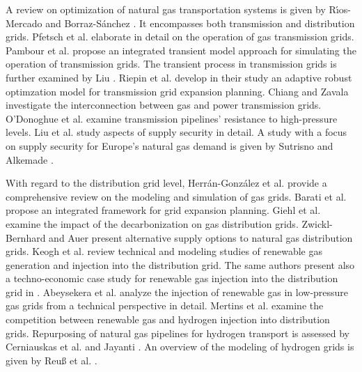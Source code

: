 A review on optimization of natural gas transportation systems is given by R{\'\i}os-Mercado and Borraz-S{\'a}nchez \cite{rios2015optimization}. It encompasses both transmission and distribution grids. Pfetsch et al. \cite{pfetsch2015validation} elaborate in detail on the operation of gas transmission grids. Pambour et al. \cite{pambour2016integrated} propose an integrated transient model approach for simulating the operation of transmission grids. The transient process in transmission grids is further examined by Liu \cite{liu2011coordinated}. Riepin et al. \cite{riepin2022adaptive} develop in their study an adaptive robust optimzation model for transmission grid expansion planning. Chiang and Zavala \cite{chiang2016large} investigate the interconnection between gas and power transmission grids. O'Donoghue et al. \cite{o1997development} examine transmission pipelines' resistance to high-pressure levels. Liu et al. \cite{liu2009security} study aspects of supply security in detail. A study with a focus on supply security for Europe's natural gas demand is given by Sutrisno and Alkemade \cite{sutrisno2020eu}.\vspace{0.3cm}

With regard to the distribution grid level, Herr{\'a}n-Gonz{\'a}lez et al. \cite{herran2009modeling} provide a comprehensive review on the modeling and simulation of gas grids. Barati et al. \cite{barati2014multi} propose an integrated framework for grid expansion planning.  Giehl et al. \cite{giehl2023assessment} examine the impact of the decarbonization on gas distribution grids. Zwickl-Bernhard and Auer \cite{zwickl2022demystifying} present alternative supply options to natural gas distribution grids. Keogh et al. \cite{keogh2022gas} review technical and modeling studies of renewable gas generation and injection into the distribution grid. The same authors present also a techno-economic case study for renewable gas injection into the distribution grid in \cite{keogh2022gas}. Abeysekera et al. \cite{abeysekera2016steady} analyze the injection of renewable gas in low-pressure gas grids from a technical perspective in detail. Mertins et al. \cite{mertins2023competition} examine the competition between renewable gas and hydrogen injection into distribution grids. Repurposing of natural gas pipelines for hydrogen transport is assessed by Cerniauskas et al. \cite{cerniauskas2020options} and Jayanti \cite{jayanti2022repurposing}. An overview of the modeling of hydrogen grids is given by Reuß et al. \cite{reuss2019modeling}.\vspace{0.3cm}

